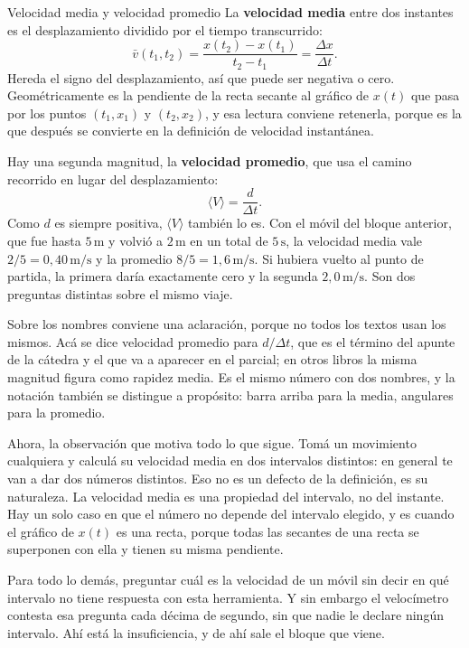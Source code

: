 \documentclass[11pt,openany]{book}
\begin{document}
\begin{bloque}{Velocidad media y velocidad promedio}
La \textbf{velocidad media} entre dos instantes es el desplazamiento dividido por el tiempo transcurrido:
\[
\bar v(t_1,t_2) = \frac{x(t_2)-x(t_1)}{t_2-t_1} = \frac{\Delta x}{\Delta t}.
\]
Hereda el signo del desplazamiento, así que puede ser negativa o cero. Geométricamente es la pendiente de la recta secante al gráfico de $x(t)$ que pasa por los puntos $(t_1,x_1)$ y $(t_2,x_2)$, y esa lectura conviene retenerla, porque es la que después se convierte en la definición de velocidad instantánea.

Hay una segunda magnitud, la \textbf{velocidad promedio}, que usa el camino recorrido en lugar del desplazamiento:
\[
\langle V\rangle = \frac{d}{\Delta t}.
\]
Como $d$ es siempre positiva, $\langle V\rangle$ también lo es. Con el móvil del bloque anterior, que fue hasta $5\,\mathrm{m}$ y volvió a $2\,\mathrm{m}$ en un total de $5\,\mathrm{s}$, la velocidad media vale $2/5 = 0{,}40\,\mathrm{m/s}$ y la promedio $8/5 = 1{,}6\,\mathrm{m/s}$. Si hubiera vuelto al punto de partida, la primera daría exactamente cero y la segunda $2{,}0\,\mathrm{m/s}$. Son dos preguntas distintas sobre el mismo viaje.

Sobre los nombres conviene una aclaración, porque no todos los textos usan los mismos. Acá se dice velocidad promedio para $d/\Delta t$, que es el término del apunte de la cátedra y el que va a aparecer en el parcial; en otros libros la misma magnitud figura como rapidez media. Es el mismo número con dos nombres, y la notación también se distingue a propósito: barra arriba para la media, angulares para la promedio.

Ahora, la observación que motiva todo lo que sigue. Tomá un movimiento cualquiera y calculá su velocidad media en dos intervalos distintos: en general te van a dar dos números distintos. Eso no es un defecto de la definición, es su naturaleza. La velocidad media es una propiedad del intervalo, no del instante. Hay un solo caso en que el número no depende del intervalo elegido, y es cuando el gráfico de $x(t)$ es una recta, porque todas las secantes de una recta se superponen con ella y tienen su misma pendiente.

Para todo lo demás, preguntar cuál es la velocidad de un móvil sin decir en qué intervalo no tiene respuesta con esta herramienta. Y sin embargo el velocímetro contesta esa pregunta cada décima de segundo, sin que nadie le declare ningún intervalo. Ahí está la insuficiencia, y de ahí sale el bloque que viene.


\end{bloque}
\end{document}
